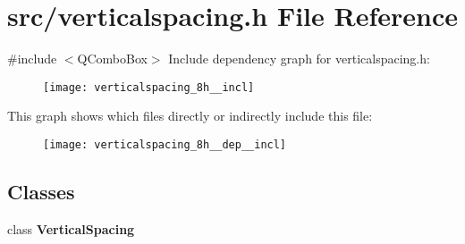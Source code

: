 \section{src/verticalspacing.h File Reference}
\label{verticalspacing_8h}
{\ttfamily \#include $<$Q\+Combo\+Box$>$}\newline
Include dependency graph for verticalspacing.\+h\+:\nopagebreak
\begin{figure}[H]
\begin{center}
\leavevmode
\texttt{[image: verticalspacing\_8h\_\_incl]}
\end{center}
\end{figure}
This graph shows which files directly or indirectly include this file\+:\nopagebreak
\begin{figure}[H]
\begin{center}
\leavevmode
\texttt{[image: verticalspacing\_8h\_\_dep\_\_incl]}
\end{center}
\end{figure}
\subsection*{Classes}
\begin{DoxyCompactItemize}
\item 
class \textbf{ Vertical\+Spacing}
\end{DoxyCompactItemize}
